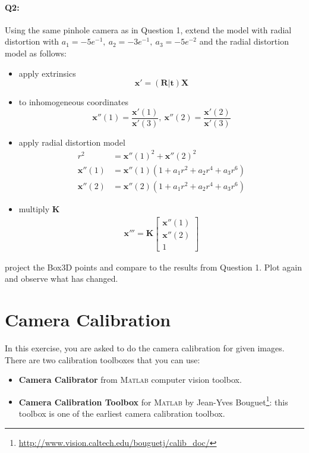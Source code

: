 \documentclass[a4paper]{article}
\begin{document}
\paragraph{Q2:} 
Using the same pinhole camera as in Question 1, extend the model with radial distortion with $a_1 = -5e^{-1},\ a_2 = -3e^{-1},\ a_3 = -5e^{-2}$ and the radial distortion model as follows:
\begin{itemize}
\item apply extrinsics $$ \mathbf{x}' = \left(\mathbf{R} | \mathbf{t}\right) \mathbf{X} $$ 
\item to inhomogeneous coordinates
$$
\mathbf{x}''(1)=\frac{\mathbf{x}'(1)}{\mathbf{x}'(3)},\ \mathbf{x}''(2)=\frac{\mathbf{x}'(2)}{\mathbf{x}'(3)}
$$
\item apply radial distortion model
\begin{align*}
r^2 &= \mathbf{x}''(1)^2+\mathbf{x}''(2)^2 \\
\mathbf{x}''(1) &= \mathbf{x}''(1)(1+a_1r^2+a_2r^4+a_3r^6) \\
\mathbf{x}''(2) &= \mathbf{x}''(2)(1+a_1r^2+a_2r^4+a_3r^6)
\end{align*}
\item multiply $\mathbf{K}$
\begin{align*}
\mathbf{x}''' = \mathbf{K}\left[
\begin{matrix}
\mathbf{x}''(1) \\ \mathbf{x}''(2) \\ 1
\end{matrix}
\right]
\end{align*}

\end{itemize}
project the Box3D points and compare to the results from Question 1. Plot again and observe what has changed.

\section{Camera Calibration}
In this exercise, you are asked to do the camera calibration for given images. There are two calibration toolboxes that you can use:
\begin{itemize}
\item \textbf{Camera Calibrator} from \textsc{Matlab} computer vision toolbox.
\item \textbf{Camera Calibration Toolbox} for \textsc{Matlab} by Jean-Yves Bouguet\footnote{\url{http://www.vision.caltech.edu/bouguetj/calib_doc/}}: this toolbox is one of the earliest camera calibration toolbox.
\end{itemize}
\end{document}

